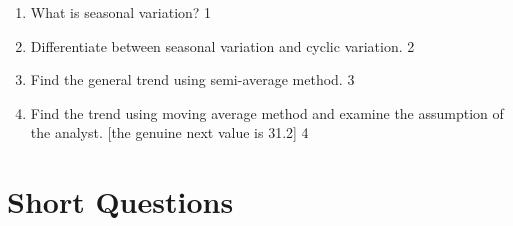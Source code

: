 \documentclass[a4paper,oneside]{book}
\begin{document}
\begin{enumerate}
  \begin{enumerate}
    \item
	What is seasonal variation? \hfill 1
    \item
	Differentiate between seasonal variation and cyclic variation. \hfill 2
    \item  
	Find the general trend using semi-average method. \hfill 3
    \item
	Find the trend using moving average method and examine the assumption of the analyst. [the genuine next value is 31.2] \hfill 4
  \end{enumerate}

\end{enumerate}

\section{Short Questions}
\end{document}
